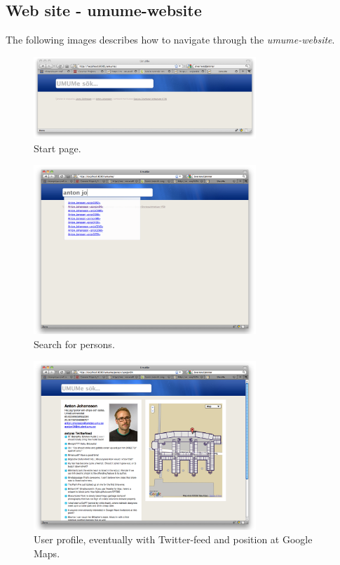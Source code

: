 \documentclass[titlepage, twocolumn, a4paper, 10pt]{article}
\begin{document}
\subsection{Web site - umume-website}

The following images describes how to navigate through 
the \textit{umume-website}.

\begin{figure}[!thb]
  \centering
  \includegraphics[width=3.3in]{images/pic1.png}
  \caption{Start page.}
  \label{fig:images/startpage}
\end{figure}

\begin{figure}[!thb]
  \centering
  \includegraphics[width=3.3in]{images/pic2.png}
  \caption{Search for persons.}
  \label{fig:images/search}
\end{figure}

\begin{figure}[!thb]
  \centering
  \includegraphics[width=3.3in]{images/pic3.png}
  \caption{User profile, eventually with Twitter-feed and position at Google Maps.}
  \label{fig:images/person}
\end{figure}
\end{document}
